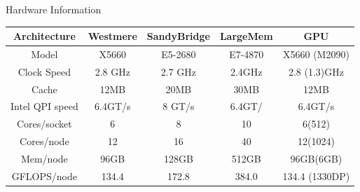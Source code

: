 \documentclass[final,t]{beamer}
\begin{document}
\begin{frame}[fragile]{}
\begin{columns}[t]
\begin{column}{.32\linewidth}
      \begin{block}{Hardware Information}
        \vspace*{-2ex}
      \begin{center}
      \begin{tabular}{|c|c|c|c|c|}
      \hline 
      \textbf{Architecture} & \textbf{Westmere} & \textbf{SandyBridge} & \textbf{LargeMem} & \textbf{GPU} \\ 
      \hline 
      Model & X5660 & E5-2680 & E7-4870 & X5660 (M2090) \\ 
      \hline 
      Clock Speed & 2.8 GHz & 2.7 GHz & 2.4GHz & 2.8 (1.3)GHz\\ 
      \hline 
      Cache & 12MB & 20MB & 30MB & 12MB\\ 
      \hline 
      Intel QPI speed & 6.4GT/s & 8 GT/s & 6.4GT/ & 6.4GT/s\\ 
      \hline 
      Cores/socket & 6 & 8 & 10 & 6(512)\\ 
      \hline       
      Cores/node & 12 & 16 & 40 & 12(1024)\\ 
      \hline 
      Mem/node & 96GB & 128GB & 512GB & 96GB(6GB)\\ 
      \hline 
      GFLOPS/node & 134.4 & 172.8 & 384.0 & 134.4 (1330DP)\\ 
      \hline 
      \end{tabular} 
      \end{center}
        \vspace*{-2ex}
      \end{block}



\end{column}
\end{columns}
\end{frame}
\end{document}

